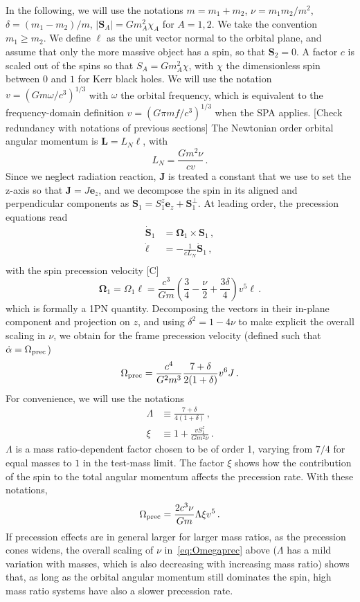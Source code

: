 \documentclass[aps,showpacs,twocolumn,
prd,superscriptaddress,nofootinbib]{revtex4-1}
\newcommand{\be}{\begin{equation}}
\newcommand{\ee}{\end{equation}}
\newcommand{\nn}{\nonumber}
\newcommand{\SM}[1]{{\color{Red} #1}}
\begin{document}
In the following, we will use the notations $m=m_{1}+m_{2}$, $\nu=m_{1}m_{2}/m^{2}$, $\delta = (m_{1}-m_{2})/m$, $|\bm{S}_{A}|=Gm_{A}^{2} \chi_{A}$ for $A=1,2$. We take the convention $m_{1} \geq m_{2}$. We define $\bm{\ell}$ as the unit vector normal to the orbital plane, and assume that only the more massive object has a spin, so that $\bm{S}_{2} = 0$. A factor $c$ is scaled out of the spins so that $S_{A} = G m_{A}^{2} \chi$, with $\chi$ the dimensionless spin between $0$ and $1$ for Kerr black holes. We will use the notation $v = (G m \omega/c^{3})^{1/3}$ with $\omega$ the orbital frequency, which is equivalent to the frequency-domain definition $v=(G \pi m f/c^{3})^{1/3}$ when the SPA applies. \SM{[Check redundancy with notations of previous sections]} The Newtonian order orbital angular momentum is $\bm{L} = L_{N} \bm{\ell}$, with
\be\label{eq:defLN}
	L_{N} = \frac{G m^{2} \nu}{c v} \,.
\ee
Since we neglect radiation reaction, $\bm{J}$ is treated a constant that we use to set the z-axis so that $\bm{J} = J \bm{e}_{z}$, and we decompose the spin in its aligned and perpendicular components as $\bm{S}_{1} = S_{1}^{z} \bm{e}_{z} + \bm{S}_{1}^{\perp}$. At leading order, the precession equations read
\begin{align}
	\dot{\bm{S}}_{1} &= \bm{\Omega}_{1} \times \bm{S}_{1} \,, \nn\\
	\dot{\bm{\ell}} &= - \frac{1}{c L_{N}}  \dot{\bm{S}}_{1}\,, \nn\\
\end{align}
with the spin precession velocity \cite{} \SM{[C]}
\be
	\bm{\Omega}_{1} = \Omega_{1} \bm{\ell} = \frac{c^{3}}{G m} \left( \frac{3}{4} - \frac{\nu}{2} + \frac{3\delta}{4} \right) v^{5} \bm{\ell} \,.
\ee
which is formally a 1PN quantity. Decomposing the vectors in their in-plane component and projection on $z$, and using $\delta^{2} = 1-4\nu$ to make explicit the overall scaling in $\nu$, we obtain for the frame precession velocity (defined such that $\dot{\alpha} = \Omega_{\rm prec}$)
\be
	\Omega_{\rm prec} = \frac{c^{4}}{G^{2} m^{3}} \frac{7+\delta}{2(1+\delta)} v^{6} J\,.
\ee
For convenience, we will use the notations
\begin{subequations}
\begin{align}
	\Lambda &\equiv \frac{7+\delta}{4(1+\delta)} \,, \\
	\xi &\equiv 1 + \frac{v S_{1}^{z}}{G m^{2} \nu} \,.
\end{align}
\end{subequations}
$\Lambda$ is a mass ratio-dependent factor chosen to be of order 1, varying from $7/4$ for equal masses to $1$ in the test-mass limit. The factor $\xi$ shows how the contribution of the spin to the total angular momentum affects the precession rate. With these notations,
\be\label{eq:Omegaprec}
	\Omega_{\rm prec} = \frac{2c^{3} \nu}{G m} \Lambda \xi v^{5} \,.
\ee
If precession effects are in general larger for larger mass ratios, as the precession cones widens, the overall scaling of $\nu$ in~\eqref{eq:Omegaprec} above ($\Lambda$ has a mild variation with masses, which is also decreasing with increasing mass ratio) shows that, as long as the orbital angular momentum still dominates the spin, high mass ratio systems have also a slower precession rate.
\end{document}
